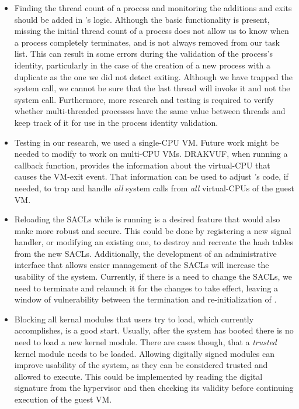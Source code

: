 \begin{itemize}

\item Finding the thread count of a process and monitoring the additions and exits should be added in 's logic. Although the basic functionality is present, missing the initial thread count of a process does not allow us to know when a process completely terminates, and is not always removed from our task list. This can result in some errors during the validation of the process's identity, particularly in the case of the creation of a new process with a duplicate  as the one we did not detect exiting. Although we have trapped the  system call, we cannot be sure that the last thread will invoke it and not the  system call.
Furthermore, more research and testing is required to verify whether multi-threaded processes have the same  value between threads and keep track of it for use in the process identity validation.


\item Testing  in our research, we used a single-\ac{CPU} \ac{VM}. Future work might be needed to modify  to work on multi-\ac{CPU} \acp{VM}. DRAKVUF, when running a callback function, provides the information about the virtual-\ac{CPU} that causes the \ac{VM}-exit event. That information can be used to adjust 's code, if needed, to trap and handle \emph{all} system calls from \emph{all} virtual-\acp{CPU} of the guest \ac{VM}.

\item Reloading the \acp{SACL} while  is running is a desired feature that would also make  more robust and secure. This could be done by registering a new signal handler, or modifying an existing one, to destroy and recreate the hash tables from the new \acp{SACL}. Additionally, the development of an administrative interface that allows easier management of the \acp{SACL} will increase the usability of the system. Currently, if there is a need to change the \acp{SACL}, we need to terminate  and relaunch it for the changes to take effect, leaving a window of vulnerability between the termination and re-initialization of . 

\item Blocking all kernal modules that users try to load, which  currently accomplishes, is a good start. Usually, after the system has booted there is no need to load a new kernel module. There are cases though, that a \emph{trusted} kernel module needs to be loaded. Allowing digitally signed modules can improve usability of the system, as they can be considered trusted and allowed to execute. This could be implemented by reading the digital signature from the hypervisor and then checking its validity before continuing execution of the guest \ac{VM}.


\end{itemize}
